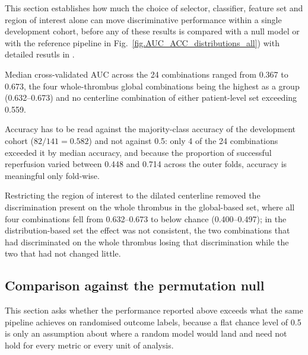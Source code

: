\documentclass[preprint,12pt]{elsarticle}
\begin{document}
This section establishes how much the choice of selector, classifier, feature set and region of interest alone can move discriminative performance within a single development cohort, before any of these results is compared with a null model or with the reference pipeline in Fig.~\ref{fig.AUC_ACC_distributions_all}) with detailed resutls in .


Median cross-validated AUC across the 24 combinations ranged from 0.367 to 0.673, the four whole-thrombus global combinations being the highest as a group (0.632--0.673) and no centerline combination of either patient-level set exceeding 0.559.

Accuracy has to be read against the majority-class accuracy of the development cohort ($82/141 = 0.582$) and not against 0.5: only 4 of the 24 combinations exceeded it by median accuracy, and because the proportion of successful reperfusion varied between 0.448 and 0.714 across the outer folds, accuracy is meaningful only fold-wise.


Restricting the region of interest to the dilated centerline removed the discrimination present on the whole thrombus in the global-based set, where all four combinations fell from 0.632--0.673 to below chance (0.400--0.497); in the distribution-based set the effect was not consistent, the two combinations that had discriminated on the whole thrombus losing that discrimination while the two that had not changed little.











\subsection{Comparison against the permutation null}

This section asks whether the performance reported above exceeds what the same pipeline achieves on randomised outcome labels, because a flat chance level of 0.5 is only an assumption about where a random model would land and need not hold for every metric or every unit of analysis.
\end{document}
